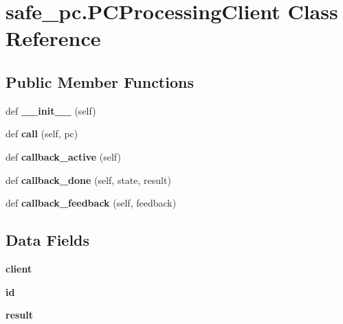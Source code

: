 \hypertarget{classsafe__pc_1_1PCProcessingClient}{}\section{safe\+\_\+pc.\+P\+C\+Processing\+Client Class Reference}
\label{classsafe__pc_1_1PCProcessingClient}
\subsection*{Public Member Functions}
\begin{DoxyCompactItemize}
\item 
\mbox{\label{classsafe__pc_1_1PCProcessingClient_a3cdf4dda33f1d942ae82855b8d0f564a}} 
def {\bfseries \+\_\+\+\_\+init\+\_\+\+\_\+} (self)
\item 
\mbox{\label{classsafe__pc_1_1PCProcessingClient_a9b74e6f7543669496ba949e7e7c67d91}} 
def {\bfseries call} (self, pc)
\item 
\mbox{\label{classsafe__pc_1_1PCProcessingClient_a559ce06d9c90ee7dfe56a1b8766c11c4}} 
def {\bfseries callback\+\_\+active} (self)
\item 
\mbox{\label{classsafe__pc_1_1PCProcessingClient_a49aa1db34a6abd30a99181fd16c7dc06}} 
def {\bfseries callback\+\_\+done} (self, state, result)
\item 
\mbox{\label{classsafe__pc_1_1PCProcessingClient_a1d0bad4bede665c04730787e1ac00db6}} 
def {\bfseries callback\+\_\+feedback} (self, feedback)
\end{DoxyCompactItemize}
\subsection*{Data Fields}
\begin{DoxyCompactItemize}
\item 
\mbox{\label{classsafe__pc_1_1PCProcessingClient_aca46b324715a852d98cb543b7eeba3f6}} 
{\bfseries client}
\item 
\mbox{\label{classsafe__pc_1_1PCProcessingClient_ad500541c07dd9e2cf79120eb39a559db}} 
{\bfseries id}
\item 
\mbox{\label{classsafe__pc_1_1PCProcessingClient_a39082124a18025dd7b840c73d0220c61}} 
{\bfseries result}
\end{DoxyCompactItemize}


